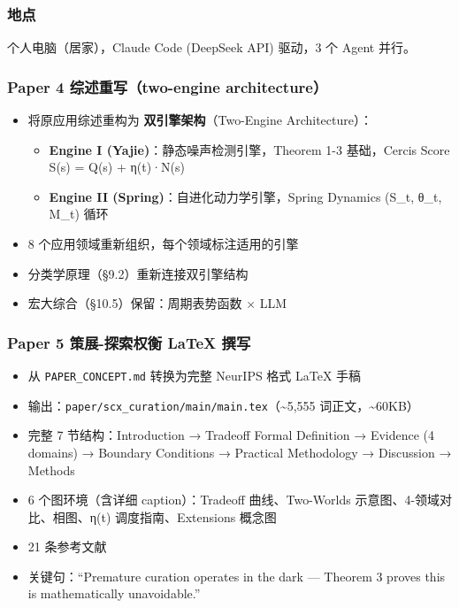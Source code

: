 \documentclass[
  12pt,
]{ctexart}
\providecommand{\tightlist}{%
  \setlength{\itemsep}{0pt}\setlength{\parskip}{0pt}}
\begin{document}
\subsubsection{地点}\label{ux5730ux70b9-1}

个人电脑（居家），Claude Code (DeepSeek API) 驱动，3 个 Agent 并行。

\subsubsection{Paper 4 综述重写（two-engine
architecture）}\label{paper-4-ux7efcux8ff0ux91cdux5199two-engine-architecture}

\begin{itemize}
\tightlist
\item
  将原应用综述重构为 \textbf{双引擎架构}（Two-Engine Architecture）：

  \begin{itemize}
  \tightlist
  \item
    \textbf{Engine I (Yajie)}：静态噪声检测引擎，Theorem 1-3
    基础，Cercis Score S(s) = Q(s) + η(t)·N(s)
  \item
    \textbf{Engine II (Spring)}：自进化动力学引擎，Spring Dynamics
    (S\_t, θ\_t, M\_t) 循环
  \end{itemize}
\item
  8 个应用领域重新组织，每个领域标注适用的引擎
\item
  分类学原理（§9.2）重新连接双引擎结构
\item
  宏大综合（§10.5）保留：周期表势函数 × LLM
\end{itemize}

\subsubsection{Paper 5 策展-探索权衡 LaTeX
撰写}\label{paper-5-ux7b56ux5c55-ux63a2ux7d22ux6743ux8861-latex-ux64b0ux5199}

\begin{itemize}
\tightlist
\item
  从 \texttt{PAPER\_CONCEPT.md} 转换为完整 NeurIPS 格式 LaTeX 手稿
\item
  输出：\texttt{paper/scx\_curation/main/main.tex}（\textasciitilde5,555
  词正文，\textasciitilde60KB）
\item
  完整 7 节结构：Introduction → Tradeoff Formal Definition → Evidence (4
  domains) → Boundary Conditions → Practical Methodology → Discussion →
  Methods
\item
  6 个图环境（含详细 caption）：Tradeoff 曲线、Two-Worlds
  示意图、4-领域对比、相图、η(t) 调度指南、Extensions 概念图
\item
  21 条参考文献
\item
  关键句：``Premature curation operates in the dark --- Theorem 3 proves
  this is mathematically unavoidable.''
\end{itemize}
\end{document}
